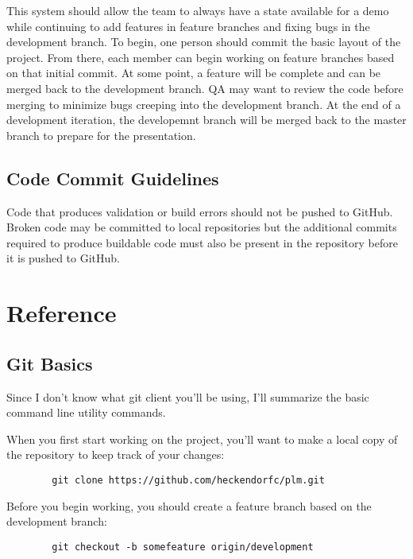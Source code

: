 \documentclass{article}
\begin{document}
	This system should allow the team to always have a state available for a demo while continuing to add features in feature branches and fixing bugs in the development branch. To begin, one person should commit the basic layout of the project. From there, each member can begin working on feature branches based on that initial commit. At some point, a feature will be complete and can be merged back to the development branch. QA may want to review the code before merging to minimize bugs creeping into the development branch. At the end of a development iteration, the developemnt branch will be merged back to the master branch to prepare for the presentation.

	\subsection {Code Commit Guidelines}

	Code that produces validation or build errors should not be pushed to GitHub. Broken code may be committed to local repositories but the additional commits required to produce buildable code must also be present in the repository before it is pushed to GitHub.

	\section{Reference}

	\subsection{Git Basics}

	Since I don't know what git client you'll be using, I'll summarize the basic command line utility commands.

	When you first start working on the project, you'll want to make a local copy of the repository to keep track of your changes:

	\begin{minipage}{0.95\textwidth}\begin{lstlisting}
	    git clone https://github.com/heckendorfc/plm.git
	\end{lstlisting}\end{minipage}

	Before you begin working, you should create a feature branch based on the development branch:

	\begin{minipage}{0.95\textwidth}\begin{lstlisting}
	    git checkout -b somefeature origin/development
	\end{lstlisting}\end{minipage}
\end{document}
